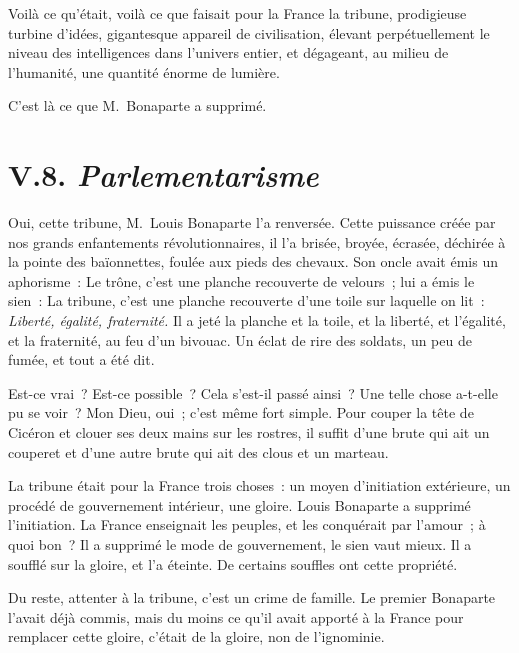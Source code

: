 \documentclass[french,twoside]{book} %
\begin{document}
Voilà ce qu’était, voilà ce que faisait pour la France la tribune, prodigieuse turbine d’idées, gigantesque appareil de civilisation, élevant perpétuellement le niveau des intelligences dans l’univers entier, et dégageant, au milieu de l’humanité, une quantité énorme de lumière.\par
C’est là ce que M. Bonaparte a supprimé.

\section[{V.8. Parlementarisme}]{V.8. \emph{Parlementarisme}}

\noindent Oui, cette tribune, M. Louis Bonaparte l’a renversée. Cette puissance créée par nos grands enfantements révolutionnaires, il l’a brisée, broyée, écrasée, déchirée à la pointe des baïonnettes, foulée aux pieds des chevaux. Son oncle avait émis un aphorisme : Le trône, c’est une planche recouverte de velours ; lui a émis le sien : La tribune, c’est une planche recouverte d’une toile sur laquelle on lit : \emph{Liberté, égalité, fraternité.} Il a jeté la planche et la toile, et la liberté, et l’égalité, et la fraternité, au feu d’un bivouac. Un éclat de rire des soldats, un peu de fumée, et tout a été dit.\par
Est-ce vrai ? Est-ce possible ? Cela s’est-il passé ainsi ? Une telle chose a-t-elle pu se voir ? Mon Dieu, oui ; c’est même fort simple. Pour couper la tête de Cicéron et clouer ses deux mains sur les rostres, il suffit d’une brute qui ait un couperet et d’une autre brute qui ait des clous et un marteau.\par
La tribune était pour la France trois choses : un moyen d’initiation extérieure, un procédé de gouvernement intérieur, une gloire. Louis Bonaparte a supprimé l’initiation. La France enseignait les peuples, et les conquérait par l’amour ; à quoi bon ? Il a supprimé le mode de gouvernement, le sien vaut mieux. Il a soufflé sur la gloire, et l’a éteinte. De certains souffles ont cette propriété.\par
Du reste, attenter à la tribune, c’est un crime de famille. Le premier Bonaparte l’avait déjà commis, mais du moins ce qu’il avait apporté à la France pour remplacer cette gloire, c’était de la gloire, non de l’ignominie.\par
\end{document}
